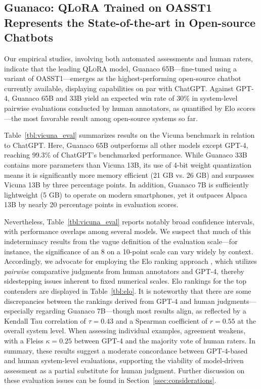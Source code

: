 \subsection{\textbf{Guanaco}: \textsc{QLoRA} Trained on OASST1 Represents the State-of-the-art in Open-source Chatbots} 

Our empirical studies, involving both automated assessments and human raters, indicate that the leading \textsc{QLoRA} model, {Guanaco} 65B—fine-tuned using a variant of OASST1—emerges as the highest-performing open-source chatbot currently available, displaying capabilities on par with ChatGPT. Against GPT-4, {Guanaco} 65B and 33B yield an expected win rate of 30\% in system-level pairwise evaluations conducted by human annotators, as quantified by Elo scores—the most favorable result among open-source systems so far.

Table~\ref{tbl:vicuna_eval} summarizes results on the Vicuna benchmark \cite{vicuna2023} in relation to ChatGPT. Here, {Guanaco} 65B outperforms all other models except GPT-4, reaching 99.3\% of ChatGPT’s benchmarked performance. While {Guanaco} 33B contains more parameters than Vicuna 13B, its use of 4-bit weight quantization means it is significantly more memory efficient (21 GB vs. 26 GB) and surpasses Vicuna 13B by three percentage points. In addition, {Guanaco} 7B is sufficiently lightweight (5 GB) to operate on modern smartphones, yet it outpaces Alpaca 13B by nearly 20 percentage points in evaluation scores.

Nevertheless, Table~\ref{tbl:vicuna_eval} reports notably broad confidence intervals, with performance overlaps among several models. We suspect that much of this indeterminacy results from the vague definition of the evaluation scale—for instance, the significance of an 8 on a 10-point scale can vary widely by context. Accordingly, we advocate for employing the Elo ranking approach \citep{elo1967proposed}, which utilizes \textit{pairwise} comparative judgments from human annotators and GPT-4, thereby sidestepping issues inherent to fixed numerical scales. Elo rankings for the top contenders are displayed in Table~\ref{tbl:elo}. It is noteworthy that there are some discrepancies between the rankings derived from GPT-4 and human judgments—especially regarding Guanaco 7B—though most results align, as reflected by a Kendall Tau correlation of $\tau=0.43$ and a Spearman coefficient of $r=0.55$ at the overall system level. When assessing individual examples, agreement weakens, with a Fleiss $\kappa=0.25$ between GPT-4 and the majority vote of human raters. In summary, these results suggest a moderate concordance between GPT-4-based and human system-level evaluations, supporting the viability of model-driven assessment as a partial substitute for human judgment. Further discussion on these evaluation issues can be found in Section~\ref{ssec:considerations}.

